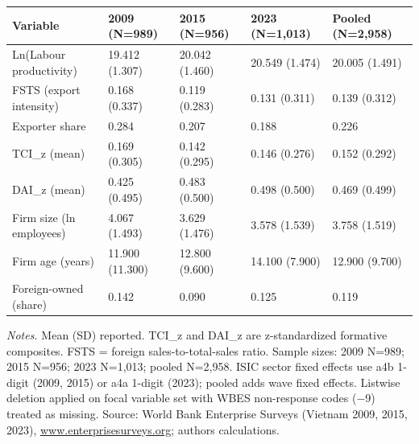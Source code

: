 \documentclass[12pt,a4paper]{article}
\begin{document}
\begin{longtable}[]{@{}lllll@{}}
\toprule\noalign{}
Variable & 2009 (N=989) & 2015 (N=956) & 2023 (N=1,013) & Pooled
(N=2,958) \\
\midrule\noalign{}
\endhead
\bottomrule\noalign{}
\endlastfoot
Ln(Labour productivity) & 19.412 (1.307) & 20.042 (1.460) & 20.549
(1.474) & 20.005 (1.491) \\
FSTS (export intensity) & 0.168 (0.337) & 0.119 (0.283) & 0.131 (0.311)
& 0.139 (0.312) \\
Exporter share & 0.284 & 0.207 & 0.188 & 0.226 \\
TCI\_z (mean) & 0.169 (0.305) & 0.142 (0.295) & 0.146 (0.276) & 0.152
(0.292) \\
DAI\_z (mean) & 0.425 (0.495) & 0.483 (0.500) & 0.498 (0.500) & 0.469
(0.499) \\
Firm size (ln employees) & 4.067 (1.493) & 3.629 (1.476) & 3.578 (1.539)
& 3.758 (1.519) \\
Firm age (years) & 11.900 (11.300) & 12.800 (9.600) & 14.100 (7.900) &
12.900 (9.700) \\
Foreign-owned (share) & 0.142 & 0.090 & 0.125 & 0.119 \\
\end{longtable}

\emph{Notes.} Mean (SD) reported. TCI\_z and DAI\_z are z-standardized
formative composites. FSTS = foreign sales-to-total-sales ratio. Sample
sizes: 2009 N=989; 2015 N=956; 2023 N=1,013; pooled N=2,958. ISIC sector
fixed effects use a4b 1-digit (2009, 2015) or a4a 1-digit (2023); pooled
adds wave fixed effects. Listwise deletion applied on focal variable set
with WBES non-response codes (−9) treated as missing. Source: World Bank
Enterprise Surveys (Vietnam 2009, 2015, 2023),
\href{http://www.enterprisesurveys.org;}{www.enterprisesurveys.org;}
authors\textquotesingle{} calculations.
\end{document}
